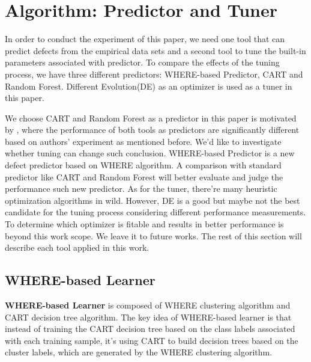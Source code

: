 \documentclass{sig-alternative}
\begin{document}
\section{Algorithm: Predictor and Tuner}

In order to conduct the experiment of this paper, we need one tool that can predict defects 
from the empirical data sets and a second tool to tune the built-in parameters associated with 
predictor. To compare the effects of the tuning process, we have three different predictors: 
WHERE-based Predictor, CART and Random Forest. Different Evolution(DE) as an optimizer 
is used as a tuner in this paper.

We choose CART and Random Forest as a predictor in this paper is motivated by 
\cite{lessmann2008benchmarking}, where the performance of both tools as predictors are 
significantly different based on authors' experiment as mentioned before. We'd like to 
investigate whether tuning can change such conclusion. WHERE-based Predictor is a new 
defect predictor based on WHERE\cite{menzies2013local} algorithm. A comparison with 
standard predictor like CART and Random Forest will better evaluate and judge the 
performance such new predictor. As for the tuner, there're many heuristic optimization 
algorithms in wild. However, DE is a good but maybe not the best candidate for the tuning 
process considering different performance measurements. To determine which optimizer is 
fitable and results in better performance is beyond this work scope. We leave it to future 
works. The rest of this section will describe each tool applied in this work.

 \subsection{WHERE-based Learner}
\textbf{WHERE-based Learner} is composed of WHERE clustering algorithm and CART 
decision tree algorithm. The key idea of WHERE-based learner is that  instead of training the 
CART decision tree based on the class labels associated with each training sample, it's using 
CART to build decision trees based on the cluster labels, which are generated by the WHERE 
clustering algorithm.
 
\end{document}
